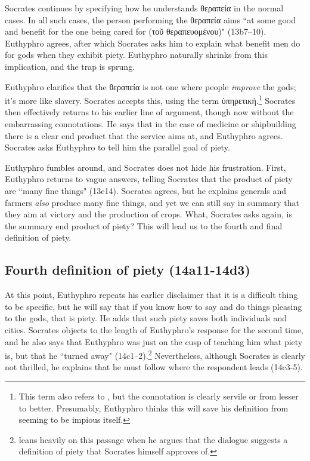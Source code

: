\documentclass[11pt]{article}
\begin{document}
Socrates continues by specifying how he understands θεραπεία in the normal
cases.  In all such cases, the person performing the θεραπεία aims ``at
some good and benefit for the one being cared for (τοῦ θεραπευομένου)"
(13b7--10).  Euthyphro agrees, after which Socrates asks him to explain
what benefit men do for gods when they exhibit piety.  Euthyphro naturally
shrinks from this implication, and the trap is sprung.

Euthyphro clarifies that the θεραπεία is not one where people
\emph{improve} the gods; it's more like slavery.  Socrates accepts this,
using the term ὑπηρετική.\footnote{This term also refers to ,
but the connotation is clearly servile or from lesser to better.
Presumably, Euthyphro thinks this will save his definition from seeming to
be impious itself.}  Socrates then effectively returns to his earlier line
of argument, though now without the embarrassing connotations.  He says
that in the case of medicine or shipbuilding there is a clear end product
that the service aims at, and Euthyphro agrees.  Socrates asks Euthyphro to
tell him the parallel goal of piety.

Euthyphro fumbles around, and Socrates does not hide his frustration.
First, Euthyphro returns to vague answers, telling Socrates that the
product of piety are ``many fine things" (13e14).  Socrates agrees, but he
explains generals and farmers \emph{also} produce many fine things, and yet
we can still say in summary that they aim at victory and the production of
crops.  What, Socrates asks again, is the summary end product of piety?
This will lead us to the fourth and final definition of piety.

\subsection{Fourth definition of piety (14a11-14d3)}

At this point, Euthyphro repeats his earlier disclaimer that it is
a difficult thing to be specific, but he will say that if you know how to
say and do things pleasing to the gods, that is piety.  He adds that such
piety saves both individuals and cities.  Socrates objects to the length of
Euthyphro's response for the second time, and he also says that Euthyphro
was just on the cusp of teaching him what piety is, but that he ``turned
away" (14c1--2).\footnote{\citet{mcpherran1992} leans heavily on this
passage when he argues that the dialogue suggests a definition of piety
that Socrates himself approves of.}  Nevertheless, although Socrates is
clearly not thrilled, he explains that he must follow where the respondent
leads (14c3-5).
\end{document}
